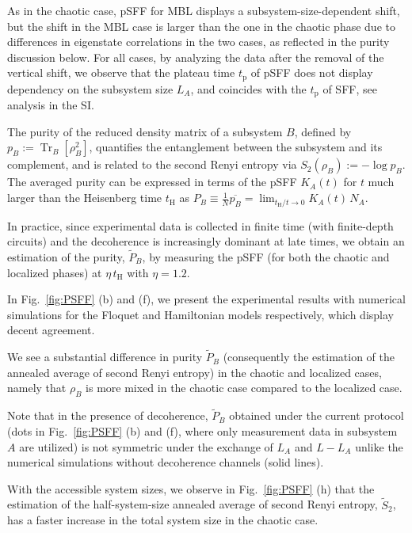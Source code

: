 \documentclass[aps,prx,reprint,twocolumn,superscriptaddress,floatfix,nofootinbib]{revtex4-2}
\newcommand{\thei}{t_{\mathrm{H}}}
\newcommand{\tplateau}{t_{\mathrm{p}}}
\begin{document}
As in the chaotic case, pSFF for MBL displays a subsystem-size-dependent shift, but the shift in the MBL case is larger than the one in the chaotic phase due to differences in eigenstate correlations in the two cases, as reflected in the purity discussion below.
For all cases, by analyzing the data after the removal of the vertical shift, we observe that the plateau time $\tplateau$ of pSFF does not display dependency on the subsystem size $L_A$, and coincides with the $\tplateau$ of SFF, see analysis in the SI.

The purity of the reduced density matrix of a subsystem $B$, defined by $p_B:= \operatorname{Tr}_B \left[\rho_B^2 \right]$, quantifies the entanglement between the subsystem and its complement, and is related to the second Renyi entropy via $S_2(\rho_B):= -\log p_B$.
The averaged purity can be expressed in terms of the pSFF $K_A(t)$ for $t$ much larger than the Heisenberg time $\thei$ as
$P_B \equiv \frac{1}{N} \overline{p_B}
=\lim_{\thei/ t \rightarrow 0 } K_A(t ) \, N_A$.

In practice, since experimental data is collected in finite time (with finite-depth circuits) and the decoherence is increasingly dominant at late times, we obtain an estimation of the purity, $\tilde{P}_B$, by measuring the pSFF (for both the chaotic and localized phases) at $\eta \, \thei$ with $\eta = 1.2$.

In Fig.~\ref{fig:PSFF} (b) and (f), we present the experimental results with numerical simulations for the Floquet and Hamiltonian models respectively, which display decent agreement.

We see a substantial difference in purity $\tilde{P}_B$ (consequently the estimation of the annealed average of second Renyi entropy) in the chaotic and localized cases, namely that $\rho_B$ is more mixed in the chaotic case compared to the localized case.

Note that in the presence of decoherence, $\tilde{P}_B$ obtained under the current protocol (dots in Fig.~\ref{fig:PSFF} (b) and (f), where only measurement data in subsystem $A$ are utilized) is not symmetric under the exchange of $L_A$ and $L-L_A$ \cite{Brydges_2019} unlike the numerical simulations without decoherence channels (solid lines).

With the accessible system sizes, we observe in Fig.~\ref{fig:PSFF} (h) that the estimation of the half-system-size annealed average of second Renyi entropy, $\tilde{S}_2$, has a faster increase in the total system size in the chaotic case.
\end{document}
